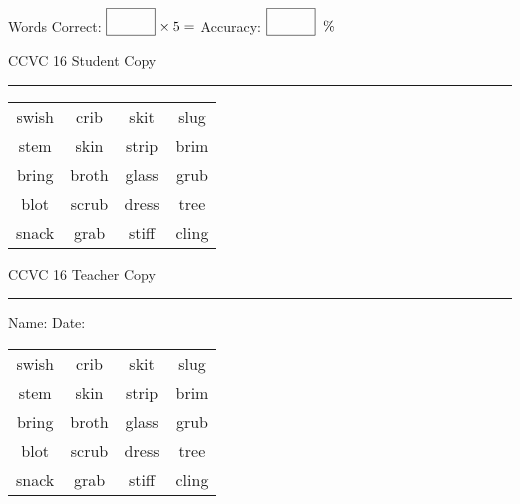 \documentclass{memoir}
\begin{document}
\small

Words Correct: $\fbox{\phantom{\huge 100}} \times 5 = $ Accuracy: $\fbox{\phantom{\huge 100}}\;\; \%$ 

\vfill

\newpage


\footnotesize \noindent
CCVC 16 \hfill Student Copy
\smallskip
\hrule

\Large

\setlength{\tabcolsep}{14pt}
\def\arraystretch{3}

{\selectfont


\begin{vplace}[0.5]
\begin{center}
\begin{tabular}{cccc}
swish & crib & skit & slug \\
stem & skin & strip & brim      \\
bring      & broth    & glass & grub \\
blot & scrub & dress & tree \\
snack & grab                    & stiff & cling \\
\end{tabular}
\end{center}
\end{vplace}

}

\newpage

\footnotesize \noindent
CCVC 16 \hfill Teacher Copy
\smallskip
\hrule

\small

\vfill

\noindent
Name: \underline{\hspace{1.75in}} \hfill Date: \underline{\hspace{1in}}

\Large

{\selectfont


\begin{vplace}[0.5]
\begin{center}
\begin{tabular}{cccc}
swish & crib & skit & slug \\
stem & skin & strip & brim      \\
bring      & broth    & glass & grub \\
blot & scrub & dress & tree \\
snack & grab                    & stiff & cling \\
\end{tabular}
\end{center}
\end{vplace}



}
\end{document}
